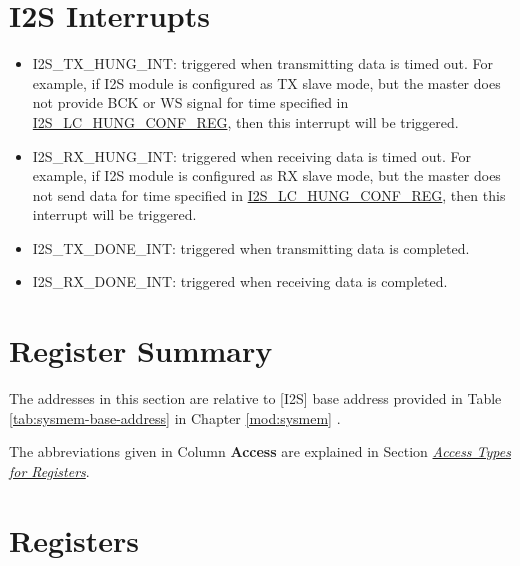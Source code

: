 \documentclass[main\_\_CN.tex]{subfiles}
\begin{document}
\section{I2S Interrupts} \label{I2S_INT}

\begin{itemize}
\item \label{int:I2STXHUNGINT}I2S\_TX\_HUNG\_INT: triggered when transmitting data is timed out. For example, if I2S module is configured as TX slave mode, but the master does not provide BCK or WS signal for time specified in  \hyperref[regdesc:I2SLCHUNGCONFREG]{I2S\_LC\_HUNG\_CONF\_REG}, then this interrupt will be triggered.
\item \label{int:I2SRXHUNGINT}I2S\_RX\_HUNG\_INT: triggered when receiving data is timed out. For example, if I2S module is configured as RX slave mode, but the master does not send data for time specified in  \hyperref[regdesc:I2SLCHUNGCONFREG]{I2S\_LC\_HUNG\_CONF\_REG}, then this interrupt will be triggered.
\item \label{int:I2STXDONEINT}I2S\_TX\_DONE\_INT: triggered when transmitting data is completed.
\item \label{int:I2SRXDONEINT}I2S\_RX\_DONE\_INT: triggered when receiving data is completed.
\end{itemize}

\hypertarget{i2s-reg-summ}{}
\section{Register Summary}

The addresses in this section are relative to [I2S] base address provided in Table \ref{tab:sysmem-base-address} in Chapter \ref{mod:sysmem} \textit{}.

The abbreviations given in Column \textbf{Access} are explained in Section \hyperref[glossary-access-types]{\textit{Access Types for Registers}}.



\section{Registers}\label{I2SRegister}

\end{document}
